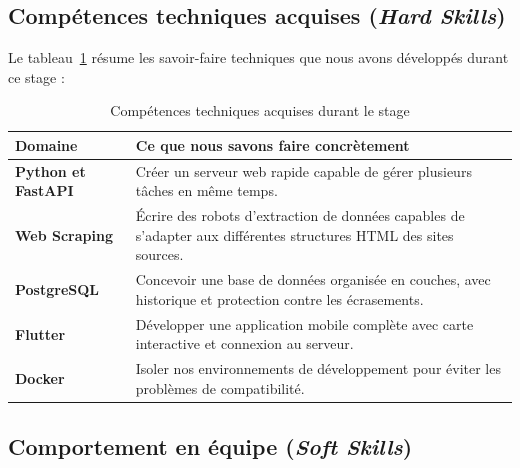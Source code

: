 \subsection{Comp\'etences techniques acquises (\emph{Hard Skills})}
Le tableau~\ref{tab:hard_skills} r\'esume les savoir-faire techniques que nous avons d\'evelopp\'es durant ce stage :

\begin{table}[H]
    \centering
    \small
    \renewcommand{\arraystretch}{1.3}
    \begin{tabularx}{\textwidth}{|l|X|}
        \hline
        \rowcolor{headergray}
        \textbf{Domaine} & \textbf{Ce que nous savons faire concr\`etement} \\ \hline
        \textbf{Python et FastAPI} & Cr\'eer un serveur web rapide capable de g\'erer plusieurs t\^aches en m\^eme temps. \\ \hline
        \textbf{Web Scraping} & \'Ecrire des robots d'extraction de donn\'ees capables de s'adapter aux diff\'erentes structures HTML des sites sources. \\ \hline
        \textbf{PostgreSQL} & Concevoir une base de donn\'ees organis\'ee en couches, avec historique et protection contre les \'ecrasements. \\ \hline
        \textbf{Flutter} & D\'evelopper une application mobile compl\`ete avec carte interactive et connexion au serveur. \\ \hline
        \textbf{Docker} & Isoler nos environnements de d\'eveloppement pour \'eviter les probl\`emes de compatibilit\'e. \\ \hline
    \end{tabularx}
    \caption{Comp\'etences techniques acquises durant le stage}
    \label{tab:hard_skills}
\end{table}

\subsection{Comportement en \'equipe (\emph{Soft Skills})}

